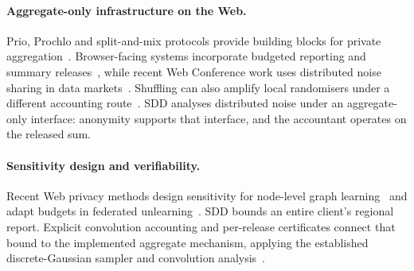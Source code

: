 \paragraph{Aggregate-only infrastructure on the Web.}
Prio, Prochlo and split-and-mix protocols provide building blocks for private
aggregation~\cite{corriganGibbs2017prio,bittau2017prochlo,ishai2006cryptography}.
Browser-facing systems incorporate budgeted reporting and summary
releases~\cite{ghazi2025sandbox,aksu2023summary}, while recent Web Conference
work uses distributed noise sharing in data markets~\cite{xing2026xemis}.
Shuffling can also amplify local randomisers
under a different accounting route~\cite{erlingsson2019amplification,feldman2021hiding}.
SDD analyses distributed noise under an aggregate-only interface: anonymity
supports that interface, and the accountant operates on the released sum.

\paragraph{Sensitivity design and verifiability.}
Recent Web privacy methods design sensitivity for node-level graph
learning~\cite{wei2026sagd} and adapt budgets in federated
unlearning~\cite{wang2026diary}. SDD bounds an entire client's regional
report. Explicit convolution accounting and per-release certificates connect
that bound to the implemented aggregate mechanism, applying the established
discrete-Gaussian sampler and convolution analysis~\cite{canonne2020discrete,kairouz2021distributed}.
